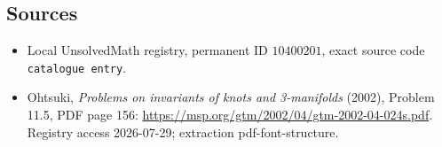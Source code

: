 \documentclass[11pt]{article}
\begin{document}
\subsection{Sources}
\begin{itemize}
\item Local UnsolvedMath registry, permanent ID \(10400201\), exact source code \texttt{catalogue entry}.
\item Ohtsuki, \emph{Problems on invariants of knots and 3-manifolds} (2002), Problem 11.5, PDF page 156: \url{https://msp.org/gtm/2002/04/gtm-2002-04-024s.pdf}. Registry access 2026-07-29; extraction pdf-font-structure.
\end{itemize}
\end{document}

